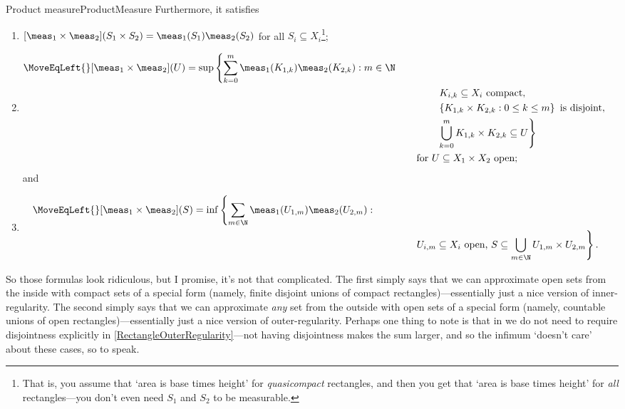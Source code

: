 \begin{thm}{Product measure}{ProductMeasure}
Furthermore, it satisfies
\begin{enumerate}
\item $[\meas _1\times \meas _2](S_1\times S_2)=\meas _1(S_1)\meas _2(S_2)$ for all $S_i\subseteq X_i$\footnote{That is, you assume that `area is base times height' for \emph{quasicompact} rectangles, and then you get that `area is base times height' for \emph{all} rectangles---you don't even need $S_1$ and $S_2$ to be measurable.};
\item
\begin{equation}\label{RectangleInnerRegularity}
\begin{split}
\MoveEqLeft {}
[\meas _1\times \meas _2](U)=\sup \left\{ \sum _{k=0}^m\meas _1(K_{1,k})\meas _2(K_{2,k}):m\in \N \right. \\
& \qquad \qquad \left. K_{i,k}\subseteq X_i\text{ compact},\right. \\
& \qquad \qquad \left. \left\{ K_{1,k}\times K_{2,k}:0\leq k\leq m\right\} \text{ is disjoint},\right. \\
& \qquad \qquad \left. \bigcup _{k=0}^mK_{1,k}\times K_{2,k}\subseteq U\right\} \\ & \qquad \text{for }U\subseteq X_1\times X_2\text{ open};
\end{split}
\end{equation}
and
\item
\begin{equation}\label{RectangleOuterRegularity}
\begin{split}
\MoveEqLeft {}
[\meas _1\times \meas _2](S)=\inf \left\{ \sum _{m\in \N}\meas _1(U_{1,m})\meas _2(U_{2,m}):\right. \\ & \qquad \qquad \left. U_{i,m}\subseteq X_i\text{ open, }S\subseteq \bigcup _{m\in \N}U_{1,m}\times U_{2,m}\right\} .
\end{split}
\end{equation}
\end{enumerate}
\begin{rmk}
So those formulas look ridiculous, but I promise, it's not that complicated.  The first simply says that we can approximate open sets from the inside with compact sets of a special form (namely, finite disjoint unions of compact rectangles)---essentially just a nice version of inner-regularity.  The second simply says that we can approximate \emph{any} set from the outside with open sets of a special form (namely, countable unions of open rectangles)---essentially just a nice version of outer-regularity.  Perhaps one thing to note is that in we do not need to require disjointness explicitly in \eqref{RectangleOuterRegularity}---not having disjointness makes the sum larger, and so the infimum `doesn't care' about these cases, so to speak.

\end{rmk}
\end{thm}
